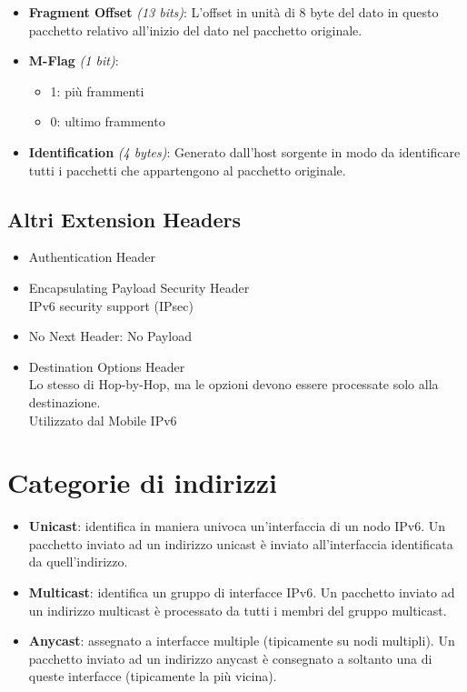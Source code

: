 \documentclass{article}
\begin{document}
\begin{itemize}
    \item \textbf{Fragment Offset} \textit{(13 bits)}: L’offset in unità di 8 byte del dato in questo pacchetto relativo all’inizio del dato nel pacchetto originale.
    \item \textbf{M-Flag} \textit{(1 bit)}:
    \begin{itemize}
        \item 1: più frammenti
        \item 0: ultimo frammento
    \end{itemize}
    \item \textbf{Identification} \textit{(4 bytes)}: Generato dall’host sorgente in modo da identificare tutti i pacchetti che appartengono al pacchetto originale.
\end{itemize}

\subsection{Altri Extension Headers}
\begin{itemize}
    \item Authentication Header
    \item Encapsulating Payload Security Header \\
    IPv6 security support (IPsec)
    \item No Next Header: No Payload
    \item Destination Options Header \\
    Lo stesso di Hop-by-Hop, ma le opzioni devono essere processate solo alla destinazione. \\
    Utilizzato dal Mobile IPv6
\end{itemize}

\section{Categorie di indirizzi}
\begin{itemize}
    \item \textbf{Unicast}: identifica in maniera univoca un’interfaccia di un nodo IPv6. Un pacchetto inviato ad un indirizzo unicast è inviato all’interfaccia identificata da quell’indirizzo.
    \item \textbf{Multicast}: identifica un gruppo di interfacce IPv6. Un pacchetto inviato ad un indirizzo multicast è processato da tutti i membri del gruppo multicast.
    \item \textbf{Anycast}: assegnato a interfacce multiple (tipicamente su nodi multipli). Un pacchetto inviato ad un indirizzo anycast è consegnato a soltanto una di queste interfacce (tipicamente la più vicina).
\end{itemize}
\end{document}
